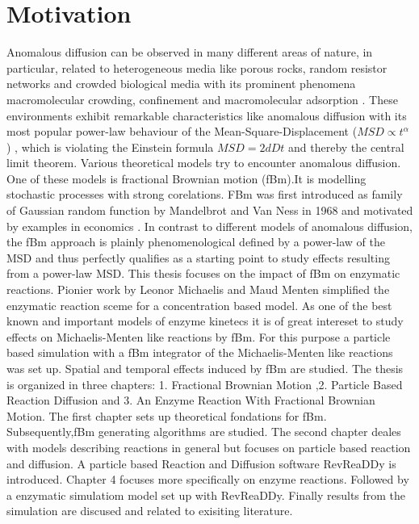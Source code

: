 \documentclass[
  a4paper,BCOR10mm,oneside,
  bibtotoc,idxtotoc,
  headsepline,footsepline,%
  fleqn,openbib
]{scrbook}
\begin{document}
\chapter*{Motivation}
Anomalous diffusion can be observed in many different areas of nature, in particular, related to heterogeneous media like porous rocks, random resistor networks and crowded biological media with its prominent phenomena macromolecular crowding, confinement and macromolecular adsorption \cite{Minton2006}. These environments exhibit remarkable characteristics like anomalous diffusion with its most popular power-law behaviour of the Mean-Square-Displacement ($MSD\propto t^{\alpha}$) \cite{Hofling2013}, which is violating the Einstein formula $MSD=2 d D t$ and thereby the central limit theorem. Various theoretical models try to encounter anomalous diffusion. One of these models is fractional Brownian motion (fBm).It is modelling stochastic processes with strong corelations. FBm was first introduced as family of Gaussian random function by Mandelbrot and Van Ness in 1968 and motivated by examples in economics \cite{Mandelbrot1968}. In contrast to different models of anomalous diffusion, the fBm approach is plainly phenomenological defined by a power-law of the MSD and thus perfectly qualifies as a starting point to study effects resulting from a power-law MSD. \newline This thesis focuses on the impact of fBm on enzymatic reactions. Pionier work by Leonor Michaelis and Maud Menten \cite{michaelis1913kinetik} simplified the enzymatic reaction sceme for a concentration based model. As one of the best known and important models of enzyme kinetecs it is of great intereset to study effects on Michaelis-Menten like reactions by fBm. For this purpose a particle based simulation with a fBm integrator of the Michaelis-Menten like reactions was set up. Spatial and temporal effects induced by fBm are studied. 
\newline The thesis is organized in three chapters: 1. Fractional Brownian Motion ,2. Particle Based Reaction Diffusion and 3. An Enzyme Reaction With Fractional Brownian Motion. The first chapter sets up theoretical fondations for fBm. Subsequently,fBm generating algorithms are studied. The second chapter deales with models describing reactions in general but focuses on particle based reaction and diffusion. A particle based Reaction and Diffusion software RevReaDDy is introduced.  Chapter 4 focuses more specifically on enzyme reactions. Followed by a enzymatic simulatiom model set up with RevReaDDy. Finally results from the simulation are discused and related to exisiting literature.
\end{document}
